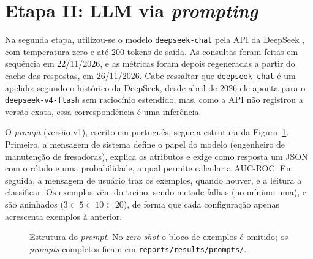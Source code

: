\documentclass[12pt]{article}
\begin{document}
\section{Etapa II: LLM via \textit{prompting}}\label{sec:etapa2}

Na segunda etapa, utilizou-se o modelo \texttt{deepseek-chat} pela API da DeepSeek \cite{deepseek2026}, com temperatura zero e até 200 tokens de saída. As consultas foram feitas em sequência em 22/11/2026, e as métricas foram depois regeneradas a partir do cache das respostas, em 26/11/2026. Cabe ressaltar que \texttt{deepseek-chat} é um apelido: segundo o histórico da DeepSeek, desde abril de 2026 ele aponta para o \texttt{deepseek-v4-flash} sem raciocínio estendido, mas, como a API não registrou a versão exata, essa correspondência é uma inferência.

O \textit{prompt} (versão v1), escrito em português, segue a estrutura da Figura~\ref{fig:prompt}. Primeiro, a mensagem de sistema define o papel do modelo (engenheiro de manutenção de fresadoras), explica os atributos e exige como resposta um JSON com o rótulo e uma probabilidade, a qual permite calcular a AUC-ROC. Em seguida, a mensagem de usuário traz os exemplos, quando houver, e a leitura a classificar. Os exemplos vêm do treino, sendo metade falhas (no mínimo uma), e são aninhados ($3 \subset 5 \subset 10 \subset 20$), de forma que cada configuração apenas acrescenta exemplos à anterior.

\begin{figure}[ht]
\centering
{}
\caption{Estrutura do \textit{prompt}. No \textit{zero-shot} o bloco de exemplos é omitido; os \textit{prompts} completos ficam em \texttt{reports/results/prompts/}.}
\label{fig:prompt}
\end{figure}
\end{document}
